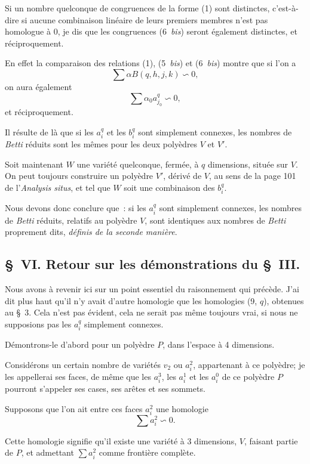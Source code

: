 \documentclass{article}
\begin{document}
Si un nombre quelconque de congruences de la forme (1) sont distinctes, c'est-à-dire si aucune combinaison linéaire de leurs premiers
membres n'est pas homologue à 0, je dis que les congruences (6~\emph{bis}) seront également distinctes, et réciproquement.

En effet la comparaison des relations (1), (5~\emph{bis}) et (6~\emph{bis}) montre que si l'on a
\[ \sum \alpha B(q, h, j, k) \backsim 0, \]
on aura également
\[ \sum \alpha_{0} a^{q}_{j_{0}} \backsim 0, \]
et réciproquement.

Il résulte de là que si les $a^{q}_{i}$ et les $b^{q}_{i}$ sont simplement connexes, les nombres de \emph{Betti} réduits sont les mêmes pour les deux polyèdres $V$ et $V'$.

Soit maintenant $W$ une variété quelconque, fermée, à $q$ dimensions, située sur $V$. On peut toujours construire un polyèdre $V'$, dérivé de $V$, au sens de la page 101 de l'\emph{Analysis situs}, et tel que $W$ soit une combinaison des $b^{q}_{i}$.

Nous devons donc conclure que~: si les $a^{q}_{i}$ sont simplement connexes, les nombres de \emph{Betti} réduits, relatifs au polyèdre $V$, sont identiques aux nombres de \emph{Betti} proprement dits, \emph{définis de la seconde manière}.

\subsection*{\S~VI. Retour sur les démonstrations du \S~III.}

Nous avons à revenir ici sur un point essentiel du raisonnement qui précède. J'ai dit plus haut qu'il n'y avait d'autre homologie que les homologies (9, $q$), obtenues au \S~3. Cela n'est pas évident, cela ne serait pas même toujours vrai, si nous ne supposions pas les $a^{q}_{i}$ simplement connexes.

Démontrons-le d'abord pour un polyèdre $P$, dans l'espace à 4 dimensions.

Considérons un certain nombre de variétés $v_{2}$ ou $a^{2}_{i}$, appartenant à ce polyèdre; je les appellerai ses faces, de même que les $a^{3}_{i}$, les $a^{1}_{i}$ et les $a^{0}_{i}$ de ce polyèdre $P$ pourront s'appeler ses cases, ses arêtes et ses sommets.


Supposons que l'on ait entre ces faces $a^{2}_{i}$ une homologie
\[ \sum a^{2}_{i} \backsim 0. \]

Cette homologie signifie qu'il existe une variété à 3 dimensions, $V$, faisant partie de $P$, et admettant $\displaystyle\sum a^{2}_{i}$ comme frontière complète.
\end{document}
